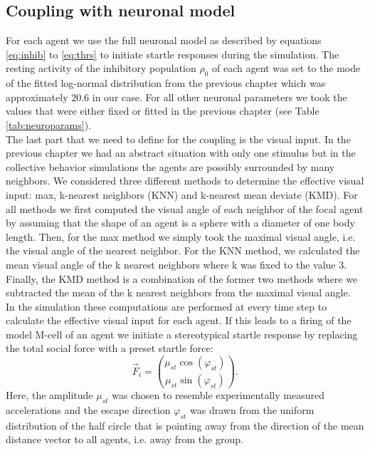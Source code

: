 \documentclass[a4paper,10pt,hidelinks]{scrreprt}
\begin{document}
	\subsection{Coupling with neuronal model}
	For each agent we use the full neuronal model as described by equations \ref{eq:inhib} to \ref{eq:thrs} to initiate startle responses during the simulation.
    The resting activity of the inhibitory population $\rho_{0}$ of each agent was set to the mode of the fitted log-normal distribution from the previous chapter which was approximately $20.6$ in our case.
    For all other neuronal parameters we took the values that were either fixed or fitted in the previous chapter (see Table \ref{tab:neuroparams}).\\
    The last part that we need to define for the coupling is the visual input.
    In the previous chapter we had an abstract situation with only one stimulus but in the collective behavior simulations the agents are possibly surrounded by many neighbors.
    We considered three different methods to determine the effective visual input: max, k-nearest neighbors (KNN) and k-nearest mean deviate (KMD).
    For all methods we first computed the visual angle of each neighbor of the focal agent by assuming that the shape of an agent is a sphere with a diameter of one body length.
    Then, for the max method we simply took the maximal visual angle, i.e. the visual angle of the nearest neighbor.
    For the KNN method, we calculated the mean visual angle of the k nearest neighbors where k was fixed to the value 3.
    Finally, the KMD method is a combination of the former two methods where we subtracted the mean of the k nearest neighbors from the maximal visual angle.\\
    In the simulation these computations are performed at every time step to calculate the effective visual input for each agent.
    If this leads to a firing of the model M-cell of an agent we initiate a stereotypical startle response by replacing the total social force with a preset startle force:
	\begin{equation}
		\vec{F}_i =  {\mu_{st} \cos(\varphi_{st}) \choose \mu_{st} \sin(\varphi_{st})}.
		\label{eq:startle_force}
	\end{equation}
    Here, the amplitude $\mu_{st}$ was chosen to resemble experimentally measured accelerations and the escape direction $\varphi_{st}$ was drawn from the uniform distribution of the half circle that is pointing away from the direction of the mean distance vector to all agents, i.e. away from the group.
\end{document}
